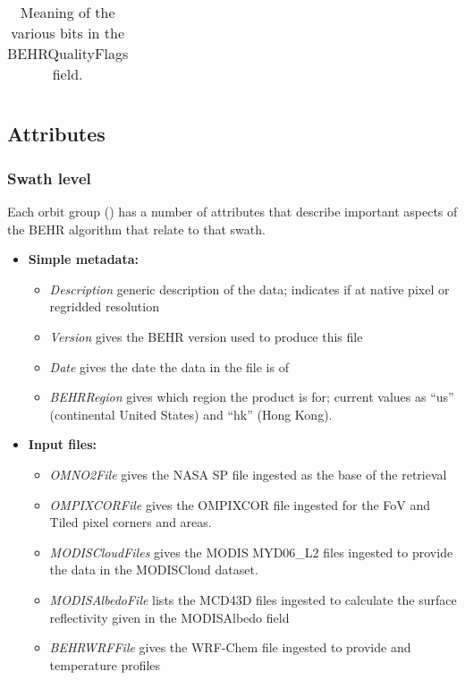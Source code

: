 \documentclass[12pt]{article}
\begin{document}
\begin{table}
\begin{tabularx}{\linewidth}{ccX}
\end{tabularx}
\caption{Meaning of the various bits in the BEHRQualityFlags field.}
\label{tab:behr-quality-flags}
\end{table}

\subsection{Attributes}
\subsubsection{Swath level}
	Each orbit group () has a number of attributes that describe important aspects of the BEHR algorithm that relate to that swath.
	
	\begin{itemize}
	\item \textbf{Simple metadata:}
		\begin{itemize}
		\item \emph{Description} generic description of the data; indicates if at native pixel or regridded resolution
		\item \emph{Version} gives the BEHR version used to produce this file
		\item \emph{Date} gives the date the data in the file is of
		
		\item \emph{BEHRRegion} gives which region the product is for; current values as ``us'' (continental United States) and ``hk'' (Hong Kong).
		\end{itemize}
		
	\item \textbf{Input files:}
		\begin{itemize}
		\item \emph{OMNO2File} gives the NASA SP file ingested as the base of the retrieval
		\item \emph{OMPIXCORFile} gives the OMPIXCOR file ingested for the FoV and Tiled pixel corners and areas.
		\item \emph{MODISCloudFiles} gives the MODIS MYD06\_L2 files ingested to provide the data in the MODISCloud dataset.
		\item \emph{MODISAlbedoFile} lists the MCD43D files ingested to calculate the surface reflectivity given in the MODISAlbedo field
		\item \emph{BEHRWRFFile} gives the WRF-Chem file ingested to provide  and temperature profiles
		\end{itemize}
		

\end{itemize}
\end{document}
